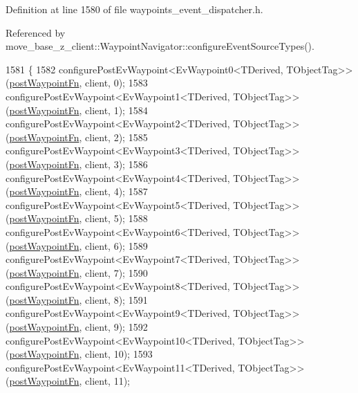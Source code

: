 Definition at line 1580 of file waypoints\+\_\+event\+\_\+dispatcher.\+h.



Referenced by move\+\_\+base\+\_\+z\+\_\+client\+::\+Waypoint\+Navigator\+::configure\+Event\+Source\+Types().


\begin{DoxyCode}
1581 \{
1582     configurePostEvWaypoint<EvWaypoint0<TDerived, TObjectTag>>(\hyperlink{classmove__base__z__client_1_1WaypointEventDispatcher_acc538eb7506c13f7cca2268a1742dadd}{postWaypointFn}, client, 0);
1583     configurePostEvWaypoint<EvWaypoint1<TDerived, TObjectTag>>(\hyperlink{classmove__base__z__client_1_1WaypointEventDispatcher_acc538eb7506c13f7cca2268a1742dadd}{postWaypointFn}, client, 1);
1584     configurePostEvWaypoint<EvWaypoint2<TDerived, TObjectTag>>(\hyperlink{classmove__base__z__client_1_1WaypointEventDispatcher_acc538eb7506c13f7cca2268a1742dadd}{postWaypointFn}, client, 2);
1585     configurePostEvWaypoint<EvWaypoint3<TDerived, TObjectTag>>(\hyperlink{classmove__base__z__client_1_1WaypointEventDispatcher_acc538eb7506c13f7cca2268a1742dadd}{postWaypointFn}, client, 3);
1586     configurePostEvWaypoint<EvWaypoint4<TDerived, TObjectTag>>(\hyperlink{classmove__base__z__client_1_1WaypointEventDispatcher_acc538eb7506c13f7cca2268a1742dadd}{postWaypointFn}, client, 4);
1587     configurePostEvWaypoint<EvWaypoint5<TDerived, TObjectTag>>(\hyperlink{classmove__base__z__client_1_1WaypointEventDispatcher_acc538eb7506c13f7cca2268a1742dadd}{postWaypointFn}, client, 5);
1588     configurePostEvWaypoint<EvWaypoint6<TDerived, TObjectTag>>(\hyperlink{classmove__base__z__client_1_1WaypointEventDispatcher_acc538eb7506c13f7cca2268a1742dadd}{postWaypointFn}, client, 6);
1589     configurePostEvWaypoint<EvWaypoint7<TDerived, TObjectTag>>(\hyperlink{classmove__base__z__client_1_1WaypointEventDispatcher_acc538eb7506c13f7cca2268a1742dadd}{postWaypointFn}, client, 7);
1590     configurePostEvWaypoint<EvWaypoint8<TDerived, TObjectTag>>(\hyperlink{classmove__base__z__client_1_1WaypointEventDispatcher_acc538eb7506c13f7cca2268a1742dadd}{postWaypointFn}, client, 8);
1591     configurePostEvWaypoint<EvWaypoint9<TDerived, TObjectTag>>(\hyperlink{classmove__base__z__client_1_1WaypointEventDispatcher_acc538eb7506c13f7cca2268a1742dadd}{postWaypointFn}, client, 9);
1592     configurePostEvWaypoint<EvWaypoint10<TDerived, TObjectTag>>(\hyperlink{classmove__base__z__client_1_1WaypointEventDispatcher_acc538eb7506c13f7cca2268a1742dadd}{postWaypointFn}, client, 10);
1593     configurePostEvWaypoint<EvWaypoint11<TDerived, TObjectTag>>(\hyperlink{classmove__base__z__client_1_1WaypointEventDispatcher_acc538eb7506c13f7cca2268a1742dadd}{postWaypointFn}, client, 11);

\end{DoxyCode}
